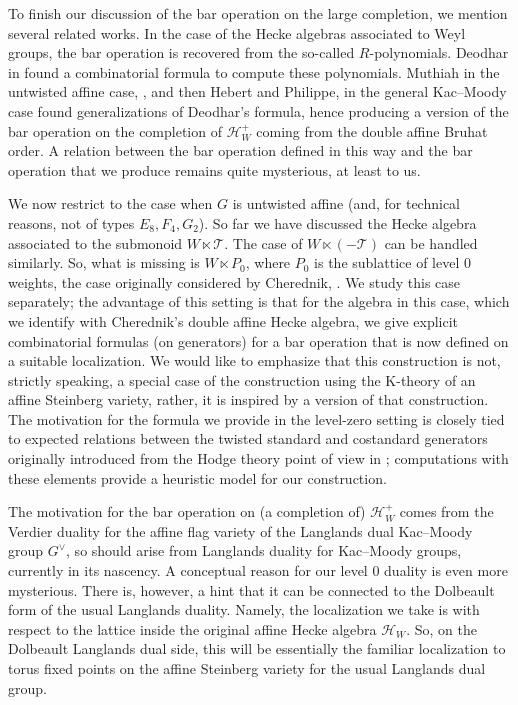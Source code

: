 \documentclass{amsart}
\newcommand{\Hecke}{\mathcal{H}}
\theoremstyle{definition}
\numberwithin{equation}{section}
\begin{document}
{
To finish our discussion of the bar operation on the large completion, we mention several related works. In the case of the Hecke algebras associated to Weyl groups, the bar operation is recovered from the so-called $R$-polynomials. Deodhar in \cite{Deodhar_1985} found a combinatorial formula to compute these polynomials. Muthiah in the untwisted affine case, \cite{Muthiah_2019}, and then Hebert and Philippe, \cite{Hebert_Philippe} in the general Kac--Moody case found generalizations of Deodhar's formula, hence producing a version of the bar operation on the completion of $\mathcal{H}_W^+$ coming from the double affine Bruhat order. A relation between the bar operation defined in this way and the bar operation that we produce remains quite mysterious, at least to us.
}


{We now restrict to the case when $G$ is untwisted affine (and, for technical reasons, not of types $E_8,F_4,G_2$). So far we have discussed the Hecke algebra associated to the submonoid $W\ltimes \mathcal{T}$. The case of $W\ltimes (-\mathcal{T})$ can be handled similarly. So, what is missing is $W\ltimes P_0$, where $P_0$ is the sublattice of level $0$ weights, the case originally considered by Cherednik, \cite{Cherednik}.
We  study this case separately; the advantage of this setting is that for the algebra in this case, which we identify with Cherednik's double affine Hecke algebra, we give explicit combinatorial formulas (on generators) for a bar operation that is now defined on a suitable localization. We would like to emphasize that this construction is not, strictly speaking, a special case of the construction using the K-theory of an affine Steinberg variety, rather, it is inspired by a version of that construction}. The motivation for the formula we provide in the level-zero setting is closely tied to expected relations between the twisted standard and costandard generators originally introduced from the Hodge theory point of view in \cite[\S 3.2--3.3]{DMB}; computations with these elements provide a heuristic model for our construction.

{ The motivation for the bar operation on (a completion of) $\mathcal{H}^+_W$ comes from the Verdier duality for the affine flag variety of the Langlands dual Kac--Moody group $G^\vee$, so should arise from Langlands duality for Kac--Moody groups, currently in its nascency. A conceptual reason for our level 0 duality is even more mysterious. There is, however, a hint that it can be connected to the Dolbeault form of the usual Langlands duality. Namely, the localization we take is with respect to the lattice inside the original affine Hecke algebra $\Hecke_W$. So, on the Dolbeault Langlands dual side, this will be essentially the familiar localization to torus fixed points on the affine Steinberg variety for the usual Langlands dual group.}
\end{document}
